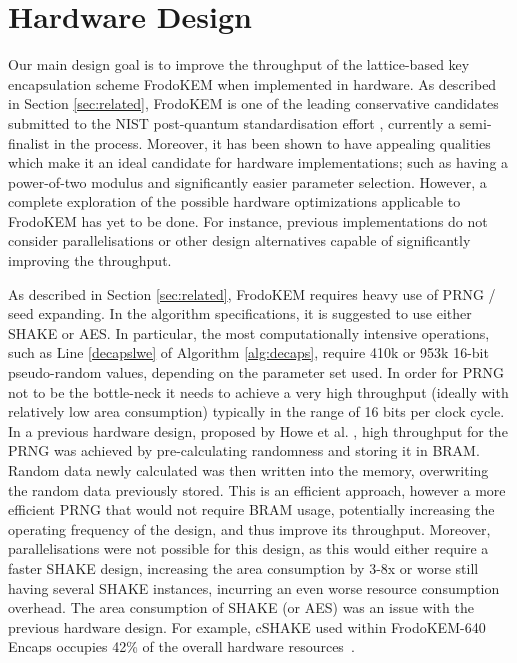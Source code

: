 \section{Hardware Design} \label{sec:design}

Our main design goal is to improve the throughput of the lattice-based key encapsulation scheme FrodoKEM \cite{frodokem} when implemented in hardware. As described in Section \ref{sec:related}, FrodoKEM is one of the leading conservative candidates submitted to the NIST post-quantum standardisation effort \cite{nistpq}, currently a semi-finalist in the process. Moreover, it has been shown to have appealing qualities which make it an ideal candidate for hardware implementations; such as having a power-of-two modulus and significantly easier parameter selection. However, a complete exploration of the possible hardware optimizations applicable to FrodoKEM has yet to be done. For instance, previous implementations do not consider parallelisations or other design alternatives capable of significantly improving the throughput.

As described in Section \ref{sec:related}, FrodoKEM requires heavy use of PRNG / seed expanding. In the algorithm specifications, it is suggested to use either SHAKE or AES. In particular, the most computationally intensive operations, such as Line \ref{decapslwe} of Algorithm \ref{alg:decaps}, require 410k or 953k 16-bit pseudo-random values, depending on the parameter set used. In order for PRNG not to be the bottle-neck it needs to achieve a very high throughput (ideally with relatively low area consumption) typically in the range of 16 bits per clock cycle. In a previous hardware design, proposed by Howe et al. \cite{howe2018standard}, high throughput for the PRNG was achieved by pre-calculating randomness and storing it in BRAM. Random data newly calculated was then written into the memory, overwriting the random data previously stored. This is an efficient approach, however a more efficient PRNG that would not require BRAM usage, potentially increasing the operating frequency of the design, and thus improve its throughput. Moreover, parallelisations were not possible for this design, as this would either require a faster SHAKE design, increasing the area consumption by 3-8x \cite{bertoni2012keccak} or worse still having several SHAKE instances, incurring an even worse resource consumption overhead. The area consumption of SHAKE (or AES) was an issue with the previous hardware design. For example, cSHAKE used within FrodoKEM-640 Encaps occupies 42\% of the overall hardware resources~\cite{howe2018standard}. 

